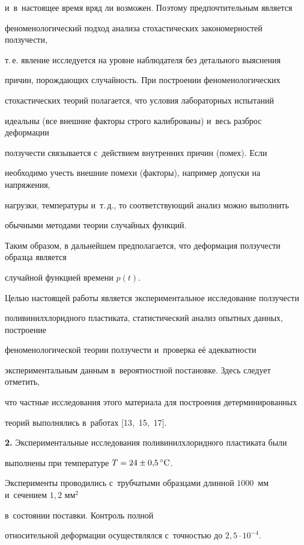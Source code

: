 и~в~настоящее время вряд ли возможен. Поэтому предпочтительным является 

феноменологический подход анализа стохастических закономерностей ползучести, 

т.\,е. явление исследуется на уровне наблюдателя без детального выяснения 

причин, порождающих случайность. При построении феноменологических 

стохастических теорий полагается, что условия лабораторных испытаний 

идеальны (все внешние факторы строго калиброваны) и~весь разброс деформации 

ползучести связывается с~действием внутренних причин (помех). Если 

необходимо учесть внешние помехи (факторы), например допуски на напряжения, 

нагрузки, температуры и~т.\,д., то соответствующий анализ можно выполнить 

обычными методами теории случайных функций.



Таким образом, в дальнейшем предполагается, что деформация ползучести образца является 

случайной функцией времени $p(t)$. 



Целью настоящей работы является экспериментальное исследование ползучести 

поливинилхлоридного пластиката, статистический анализ опытных данных, построение 

феноменологической теории ползучести и~проверка её адекватности 

экспериментальным данным в~вероятностной постановке. Здесь следует отметить, 

что частные исследования этого материала для построения детерминированных 

теорий выполнялись в~работах [13,~15,~17].



\textbf{2.} Экспериментальные исследования поливинилхлоридного пластиката были 

выполнены при температуре $T = 24\pm0{,}5\,^\circ\rm C$. 

Эксперименты проводились с~трубчатыми образцами длинной $1000$~мм и~сечением $1{,}2$ мм$^{2}$ 

в~состоянии поставки. Контроль полной 

относительной деформации осуществлялся с~точностью до $2,5 \cdot 10^{ - 4}$. 

